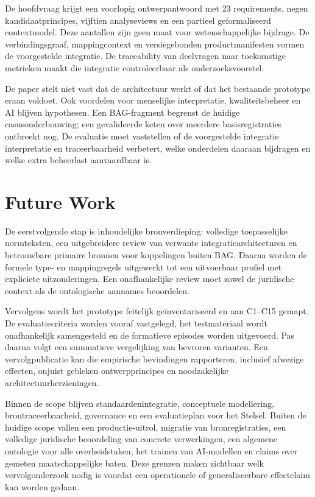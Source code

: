 De hoofdvraag krijgt een voorlopig ontwerpantwoord met 23 requirements, negen kandidaatprincipes, vijftien analyseviews en een partieel geformaliseerd contextmodel. Deze aantallen zijn geen maat voor wetenschappelijke bijdrage. De verbindingsgraaf, mappingcontext en versiegebonden productmanifesten vormen de voorgestelde integratie. De traceability van deelvragen naar toekomstige metrieken maakt die integratie controleerbaar als onderzoeksvoorstel.

De paper stelt niet vast dat de architectuur werkt of dat het bestaande prototype eraan voldoet. Ook voordelen voor menselijke interpretatie, kwaliteitsbeheer en AI blijven hypothesen. Een BAG-fragment begrenst de huidige casusonderbouwing; een gevalideerde keten over meerdere basisregistraties ontbreekt nog. De evaluatie moet vaststellen of de voorgestelde integratie interpretatie en traceerbaarheid verbetert, welke onderdelen daaraan bijdragen en welke extra beheerlast aanvaardbaar is.

\section{Future Work}
De eerstvolgende stap is inhoudelijke bronverdieping: volledige toepasselijke normteksten, een uitgebreidere review van verwante integratiearchitecturen en betrouwbare primaire bronnen voor koppelingen buiten BAG. Daarna worden de formele type- en mappingregels uitgewerkt tot een uitvoerbaar profiel met expliciete uitzonderingen. Een onafhankelijke review moet zowel de juridische context als de ontologische aannames beoordelen.

Vervolgens wordt het prototype feitelijk geïnventariseerd en aan C1--C15 gemapt. De evaluatiecriteria worden vooraf vastgelegd, het testmateriaal wordt onafhankelijk samengesteld en de formatieve episodes worden uitgevoerd. Pas daarna volgt een summatieve vergelijking van bevroren varianten. Een vervolgpublicatie kan die empirische bevindingen rapporteren, inclusief afwezige effecten, onjuist gebleken ontwerpprincipes en noodzakelijke architectuurherzieningen.

Binnen de scope blijven standaardenintegratie, conceptuele modellering, brontraceerbaarheid, governance en een evaluatieplan voor het Stelsel. Buiten de huidige scope vallen een productie-uitrol, migratie van bronregistraties, een volledige juridische beoordeling van concrete verwerkingen, een algemene ontologie voor alle overheidstaken, het trainen van AI-modellen en claims over gemeten maatschappelijke baten. Deze grenzen maken zichtbaar welk vervolgonderzoek nodig is voordat een operationele of generaliseerbare effectclaim kan worden gedaan.
